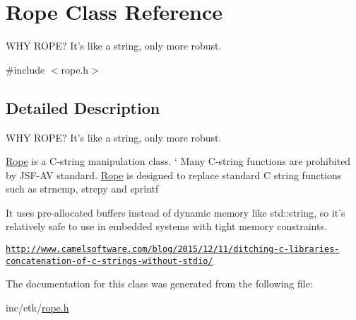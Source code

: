 \hypertarget{class_rope}{\section{Rope Class Reference}
\label{class_rope}
}


W\-H\-Y R\-O\-P\-E? It's like a string, only more robust.  




{\ttfamily \#include $<$rope.\-h$>$}



\subsection{Detailed Description}
W\-H\-Y R\-O\-P\-E? It's like a string, only more robust. 

\hyperlink{class_rope}{Rope} is a C-\/string manipulation class. ` Many C-\/string functions are prohibited by J\-S\-F-\/\-A\-V standard. \hyperlink{class_rope}{Rope} is designed to replace standard C string functions such as strncmp, strcpy and sprintf

It uses pre-\/allocated buffers instead of dynamic memory like std\-::string, so it's relatively safe to use in embedded systems with tight memory constraints.

\href{http://www.camelsoftware.com/blog/2015/12/11/ditching-c-libraries-concatenation-of-c-strings-without-stdio/}{\tt http\-://www.\-camelsoftware.\-com/blog/2015/12/11/ditching-\/c-\/libraries-\/concatenation-\/of-\/c-\/strings-\/without-\/stdio/} 

The documentation for this class was generated from the following file\-:\begin{DoxyCompactItemize}
\item 
inc/etk/\hyperlink{rope_8h}{rope.\-h}\end{DoxyCompactItemize}
